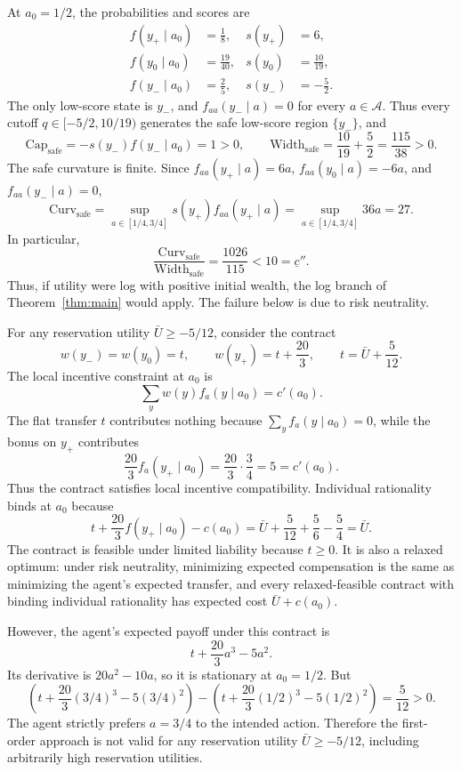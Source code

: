\documentclass[12pt]{article}
\begin{document}
At $a_0=1/2$, the probabilities and scores are
\begin{align*}
    f(y_+\mid a_0)&=\frac18, & s(y_+)&=6,\\
    f(y_0\mid a_0)&=\frac{19}{40}, & s(y_0)&=\frac{10}{19},\\
    f(y_-\mid a_0)&=\frac25, & s(y_-)&=-\frac52.
\end{align*}
The only low-score state is $y_-$, and $f_{aa}(y_-\mid a)=0$ for every
$a\in\mathcal A$.  Thus every cutoff
$q\in[-5/2,10/19)$ generates the safe low-score region $\{y_-\}$, and
\[
    \mathrm{Cap}_{\mathrm{safe}}
    =-s(y_-)f(y_-\mid a_0)=1>0,
    \qquad
    \mathrm{Width}_{\mathrm{safe}}
    =\frac{10}{19}+\frac52=\frac{115}{38}>0.
\]
The safe curvature is finite.  Since
$f_{aa}(y_+\mid a)=6a$, $f_{aa}(y_0\mid a)=-6a$, and
$f_{aa}(y_-\mid a)=0$,
\[
    \mathrm{Curv}_{\mathrm{safe}}
    =
    \sup_{a\in[1/4,3/4]} s(y_+)f_{aa}(y_+\mid a)
    =
    \sup_{a\in[1/4,3/4]}36a
    =
    27.
\]
In particular,
\[
    \frac{\mathrm{Curv}_{\mathrm{safe}}}
         {\mathrm{Width}_{\mathrm{safe}}}
    =
    \frac{1026}{115}<10=\underline c''.
\]
Thus, if utility were log with positive initial wealth, the log branch of
Theorem~\ref{thm:main} would apply.  The failure below is due to risk
neutrality.

For any reservation utility $\bar U\geq -5/12$, consider the contract
\[
    w(y_-)=w(y_0)=t,\qquad w(y_+)=t+\frac{20}{3},
    \qquad
    t=\bar U+\frac{5}{12}.
\]
The local incentive constraint at $a_0$ is
\[
    \sum_y w(y)f_a(y\mid a_0)=c'(a_0).
\]
The flat transfer $t$ contributes nothing because
$\sum_y f_a(y\mid a_0)=0$, while the bonus on $y_+$ contributes
\[
    \frac{20}{3}f_a(y_+\mid a_0)
    =
    \frac{20}{3}\cdot\frac34
    =
    5=c'(a_0).
\]
Thus the contract satisfies local incentive compatibility.  Individual
rationality binds at $a_0$ because
\[
    t+\frac{20}{3}f(y_+\mid a_0)-c(a_0)
    =
    \bar U+\frac{5}{12}+\frac56-\frac54
    =
    \bar U.
\]
The contract is feasible under limited liability because
$t\geq0$.  It is also a relaxed optimum: under risk neutrality, minimizing
expected compensation is the same as minimizing the agent's expected transfer,
and every relaxed-feasible contract with binding individual rationality has
expected cost $\bar U+c(a_0)$.

However, the agent's expected payoff under this contract is
\[
    t+\frac{20}{3}a^3-5a^2.
\]
Its derivative is $20a^2-10a$, so it is stationary at $a_0=1/2$.  But
\[
    \left(t+\frac{20}{3}(3/4)^3-5(3/4)^2\right)
    -
    \left(t+\frac{20}{3}(1/2)^3-5(1/2)^2\right)
    =
    \frac{5}{12}>0.
\]
The agent strictly prefers $a=3/4$ to the intended action.  Therefore the
first-order approach is not valid for any reservation utility
$\bar U\geq -5/12$, including arbitrarily high reservation utilities.
\end{document}
